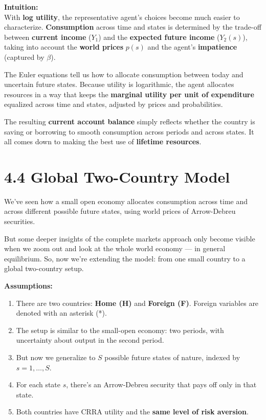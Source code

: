 \documentclass[12pt]{article}
\begin{document}
\textbf{Intuition:} \\
With \textbf{log utility}, the representative agent's choices become much easier to characterize. \textbf{Consumption} across time and states is determined by the trade-off between \textbf{current income} ($Y_1$) and the \textbf{expected future income} ($Y_2(s)$), taking into account the \textbf{world prices} $p(s)$ and the agent’s \textbf{impatience} (captured by $\beta$).

The Euler equations tell us how to allocate consumption between today and uncertain future states. Because utility is logarithmic, the agent allocates resources in a way that keeps the \textbf{marginal utility per unit of expenditure} equalized across time and states, adjusted by prices and probabilities.

The resulting \textbf{current account balance} simply reflects whether the country is saving or borrowing to smooth consumption across periods and across states. It all comes down to making the best use of \textbf{lifetime resources}.


\section*{\noindent\textbf{4.4 Global Two-Country Model}}

We’ve seen how a small open economy allocates consumption across time and across different possible future states, using world prices of Arrow-Debreu securities. 

But some deeper insights of the complete markets approach only become visible when we zoom out and look at the whole world economy — in general equilibrium.
So, now we’re extending the model: from one small country to a global two-country setup.

\vspace{0.5cm}
\textbf{Assumptions:}
\begin{enumerate}
    \item There are two countries: \textbf{Home (H)} and \textbf{Foreign (F)}. Foreign variables are denoted with an asterisk (*).
    
    \item The setup is similar to the small-open economy: two periods, with uncertainty about output in the second period.
    
    \item But now we generalize to $S$ possible future states of nature, indexed by $s = 1, \dots, S$.
    
    \item For each state $s$, there’s an Arrow-Debreu security that pays off only in that state.
    
    \item Both countries have CRRA utility and the \textbf{same level of risk aversion}.
\end{enumerate}
\end{document}
